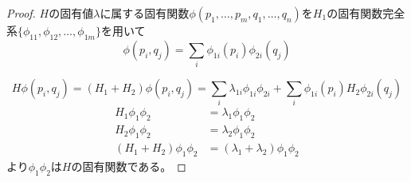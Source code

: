     \begin{proof}
        $H$の固有値$\lambda$に属する固有関数$\phi(p_1, \dots, p_m, q_1, \dots, q_n)$を$H_1$の固有関数完全系$\{\phi_{11}, \phi_{12}, \dots, \phi_{1m}\}$を用いて
            \[\phi(p_i, q_j) = \sum_i \phi_{1i}(p_i)\phi_{2i}(q_j)\]

            \[H\phi(p_i, q_j) = (H_1 + H_2)\phi(p_i, q_j) = \sum_i \lambda_{1i}\phi_{1i}\phi_{2i} + \sum_i \phi_{1i}(p_i)H_2\phi_{2i}(q_j)\]
        \begin{align*}
            H_1\phi_1\phi_2 &= \lambda_1\phi_1\phi_2\\
            H_2\phi_1\phi_2 &= \lambda_2\phi_1\phi_2\\
            (H_1 + H_2)\phi_1\phi_2 &= (\lambda_1 + \lambda_2)\phi_1\phi_2
        \end{align*}
        より$\phi_1\phi_2$は$H$の固有関数である。
    \end{proof}